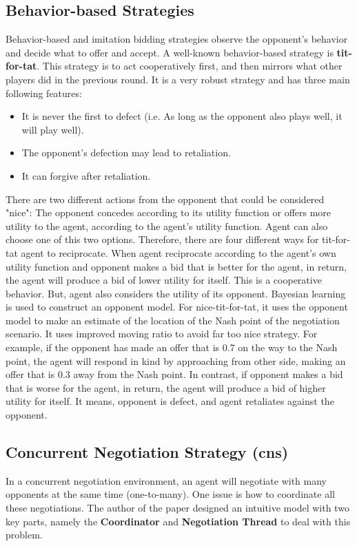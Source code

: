 \subsection{Behavior-based Strategies}
Behavior-based and imitation bidding strategies observe the opponent's behavior and decide what to offer and accept. A well-known behavior-based strategy is \textbf{tit-for-tat}. This strategy is to act cooperatively first, and then mirrors what other players did in the previous round.
It is a very robust strategy and has three main following features\parencite{Baarslag2013, chang2020multiissue}:
\begin{itemize}
\item It is never the first to defect (i.e. As long as the opponent also plays well, it will play well).
\item The opponent's defection may lead to retaliation.
\item It can forgive after retaliation.
\end{itemize}
There are two different actions from the opponent that could be considered "nice": The opponent concedes according to its utility function or offers more utility to the agent, according to the agent's utility function. Agent can also choose one of this two options. Therefore, there are four different ways for tit-for-tat agent to reciprocate. When agent reciprocate according to the agent's own utility function and opponent makes a bid that is better for the agent, in return, the agent will produce a bid of lower utility for itself. This is a cooperative behavior. But, agent also considers the utility of its opponent. Bayesian learning is used to construct an opponent model. For nice-tit-for-tat, it uses the opponent model to make an estimate of the location of the Nash point of the negotiation scenario. It uses improved moving ratio to avoid far too nice strategy. For example, if the opponent has made an offer that is 0.7 on the way to the Nash point, the agent will respond in kind by approaching from other side, making an offer that is 0.3 away from the Nash point\parencite{Baarslag2013}. In contrast, if opponent makes a bid that is worse for the agent, in return, the agent will produce a bid of higher utility for itself. It means, opponent is defect, and agent retaliates against the opponent.


\subsection{Concurrent Negotiation Strategy (\gls{cns})}
In a concurrent negotiation environment, an agent will negotiate with many opponents at the same time (one-to-many). One issue is how to coordinate all these negotiations. The author of the paper \parencite{Williams12Concurrent} designed an intuitive model with two key parts, namely the \textbf{Coordinator} and \textbf{Negotiation Thread} to deal with this problem.

